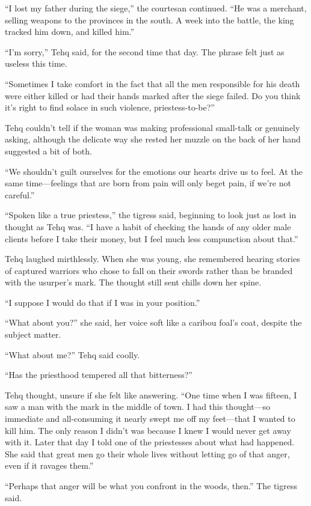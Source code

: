 ``I lost my father during the siege,'' the courtesan continued. ``He was a merchant, selling weapons to the provinces in the south. A week into the battle, the king tracked him down, and killed him.''

``I'm sorry,'' Tehq said, for the second time that day. The phrase felt just as useless this time.

``Sometimes I take comfort in the fact that all the men responsible for his death were either killed or had their hands marked after the siege failed. Do you think it's right to find solace in such violence, priestess-to-be?''

Tehq couldn't tell if the woman was making professional small-talk or genuinely asking, although the delicate way she rested her muzzle on the back of her hand suggested a bit of both.

``We shouldn't guilt ourselves for the emotions our hearts drive us to feel. At the same time---feelings that are born from pain will only beget pain, if we're not careful.''

``Spoken like a true priestess,'' the tigress said, beginning to look just as lost in thought as Tehq was. ``I have a habit of checking the hands of any older male clients before I take their money, but I feel much less compunction about that.''

Tehq laughed mirthlessly. When she was young, she remembered hearing stories of captured warriors who chose to fall on their swords rather than be branded with the usurper's mark. The thought still sent chills down her spine.

``I suppose I would do that if I was in your position.''

``What about you?'' she said, her voice soft like a caribou foal's coat, despite the subject matter.

``What about me?'' Tehq said coolly.

``Has the priesthood tempered all that bitterness?''

Tehq thought, unsure if she felt like answering. ``One time when I was fifteen, I saw a man with the mark in the middle of town. I had this thought---so immediate and all-consuming it nearly swept me off my feet---that I wanted to kill him. The only reason I didn't was because I knew I would never get away with it. Later that day I told one of the priestesses about what had happened. She said that great men go their whole lives without letting go of that anger, even if it ravages them.''

``Perhaps that anger will be what you confront in the woods, then.'' The tigress said.


